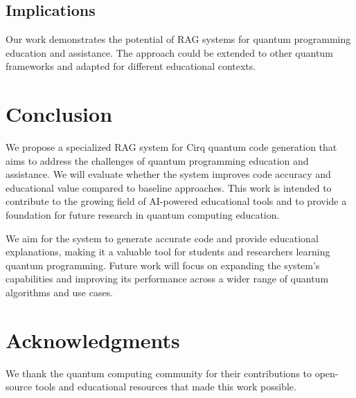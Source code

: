 \documentclass[runningheads]{llncs}
\begin{document}
\subsection{Implications}
Our work demonstrates the potential of RAG systems for quantum programming education and assistance. The approach could be extended to other quantum frameworks and adapted for different educational contexts.

\section{Conclusion}

We propose a specialized RAG system for Cirq quantum code generation that aims to address the challenges of quantum programming education and assistance. We will evaluate whether the system improves code accuracy and educational value compared to baseline approaches. This work is intended to contribute to the growing field of AI-powered educational tools and to provide a foundation for future research in quantum computing education.

We aim for the system to generate accurate code and provide educational explanations, making it a valuable tool for students and researchers learning quantum programming. Future work will focus on expanding the system's capabilities and improving its performance across a wider range of quantum algorithms and use cases.

\section*{Acknowledgments}
We thank the quantum computing community for their contributions to open-source tools and educational resources that made this work possible.


\newpage

\end{document}
